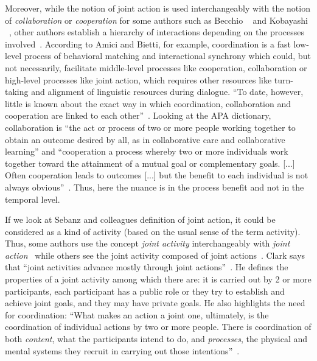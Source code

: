 \documentclass[a4paper,11pt,twoside]{StyleThese}
\begin{document}
Moreover, while the notion of joint action is used interchangeably with the notion of \emph{collaboration} or \emph{cooperation} for some authors such as Becchio \etal~\cite{becchio_2010_toward} and Kobayashi \etal~\cite{kobayashi_2018_language}, other authors establish a hierarchy of interactions depending on the processes involved~\cite{amici_2015_coordination, chalmeau_1995_cooperation}. According to Amici and Bietti, for example, coordination is a fast low-level process of behavioral matching and interactional synchrony which could, but not necessarily, facilitate middle-level processes like cooperation, collaboration or high-level processes like joint action, which requires other resources like turn-taking and alignment of linguistic resources during dialogue. ``To date, however, little is known about the exact way in which coordination, collaboration and cooperation are linked to each other''~\cite[p.~vii]{amici_2015_coordination}. Looking at the APA dictionary, collaboration is ``the act or process of two or more people working together to obtain an outcome desired by all, as in collaborative care and collaborative learning'' and ``cooperation a process whereby two or more individuals work together toward the attainment of a mutual goal
or complementary goals. [...] Often cooperation leads to outcomes [...] but the benefit to each individual is not always obvious''~\cite{sharbrough_2015_apa}. Thus, here the nuance is in the process benefit and not in the temporal level.

If we look at Sebanz and colleagues definition of joint action, it could be considered as a kind of activity (based on the usual sense of the term activity). Thus, some authors use the concept \emph{joint activity} interchangeably with \emph{joint action}~\cite{tollefsen_2005_let,grafenhain_2013_three} while others see the joint activity composed of joint actions~\cite{clark_1996_using, feltovitch_2005_common}. Clark says that ``joint activities advance mostly through joint actions''~\cite[p~.59]{clark_1996_using}. He defines the properties of a joint activity among which there are: it is carried out by 2 or more participants, each participant has a public role or they try to establish and achieve joint goals, and they may have private goals. He also highlights the need for coordination: ``What makes an action a joint one, ultimately, is the coordination of individual actions by two or more people. There is coordination of both \emph{content}, what the participants intend to do, and \emph{processes}, the physical and mental systems they recruit in carrying out those intentions''~\cite[p~.59]{clark_1996_using}. 
\end{document}
